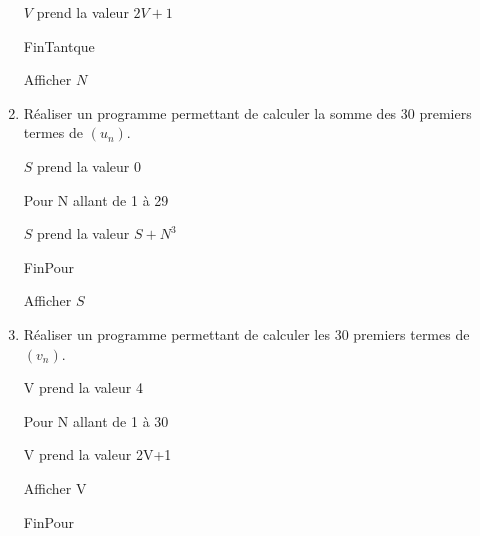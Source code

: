 \documentclass[a4paper,11pt]{article}
\theoremstyle{break}
\begin{document}
\begin{enumerate}
  $V$ prend la valeur $2V+1$
  
  FinTantque
  
  Afficher $N$
  
  \vspace{0.5cm}
  
  \item
  Réaliser un programme permettant de calculer la somme des 30 premiers termes de $(u_n)$. 
  
  
  \vspace{0.5cm}
  
  $S$ prend la valeur 0
  
  Pour N allant de 1 à 29
  
  $S$ prend la valeur $S+N^3$
    
  FinPour
  
  Afficher $S$
  
  \vspace{0.5cm}
   
  \item 
  Réaliser un programme permettant de calculer les 30 premiers termes de $(v_n)$. 
  
  
  \vspace{0.5cm}
  
  V prend la valeur 4 
  
  Pour N allant de 1 à 30
  
  V prend la valeur 2V+1
  
  Afficher V
  
  FinPour
  
  \vspace{1cm}
  
  \end{enumerate} 
 
  
\end{document}
